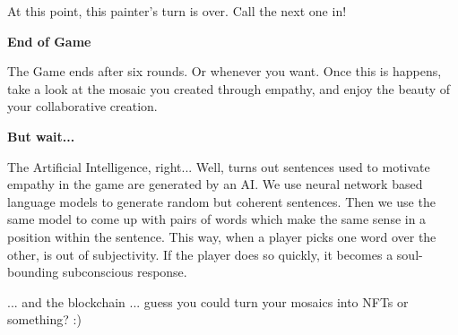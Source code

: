 \documentclass[twocolumn]{article}
\newcommand{\lvl}[1]{\vspace{0.5cm}\Large{\textbf{#1}}\vspace{0.2cm}}
\begin{document}
At this point, this painter's turn is over. Call the next one in!




\lvl{End of Game}

The Game ends after six rounds. Or whenever you want. Once this is happens, take a look at the mosaic you created through empathy, and enjoy the beauty of your collaborative creation.



\lvl{But wait...}

The Artificial Intelligence, right... Well, turns out sentences used to motivate empathy in the game are generated by an AI. We use neural network based language models to generate random but coherent sentences. Then we use the same model to come up with pairs of words which make the same sense in a position within the sentence. This way, when a player picks one word over the other, is out of subjectivity. If the player does so quickly, it becomes a soul-bounding subconscious response.

... and the blockchain ... guess you could turn your mosaics into NFTs or something? :)
% 
% 
\end{document}

